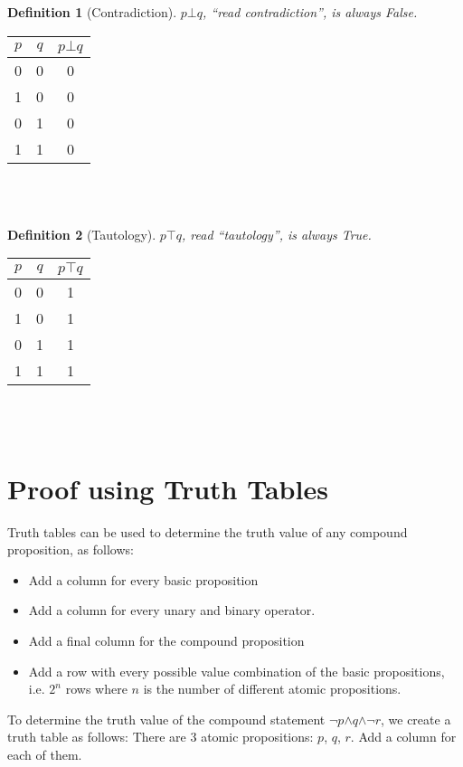 \documentclass[10pt,a4paper,draft,titlepage,onecolumn]{book}
\newtheorem{definition}{Definition}[subsection]
\begin{document}
\begin{definition}[Contradiction] $p{\bot}q$, ``read \textit{contradiction}'', is always False.
\end{definition}
\begin{tabular}{ |c|c|c| }
 \hline
 $p$ & $q$ &  $p{\bot}q$  \\
 \hline
 0 & 0 & 0 \\
 1 & 0 & 0\\
 0 & 1 & 0\\
 1 & 1 & 0\\
 \hline
\end{tabular}\\\\

\begin{definition}[Tautology] $p{\top}q$, read ``\textit{tautology}'', is always True.
\end{definition}
\begin{tabular}{ |c|c|c| }
 \hline
 $p$ & $q$ &  $p{\top}q$  \\
 \hline
 0 & 0 & 1\\
 1 & 0 & 1\\
 0 & 1 & 1\\
 1 & 1 & 1\\
 \hline
\end{tabular}\\\\



\section{Proof using Truth Tables}
Truth tables can be used to determine the truth value of any compound proposition, as follows:

\begin{itemize}
 \item Add a column for every basic proposition 
 \item Add a column for every unary and binary operator.
 \item Add a final column for the compound proposition 
 \item Add a row with every possible value combination of the basic propositions, i.e. $2^n$ rows where $n$ is the number of different atomic propositions. 
\end{itemize}


To determine the truth value of the compound statement {$\neg$}$p${$\wedge$}$q${$\wedge$}{$\neg$}$r$, we create a truth table as follows:
There are 3 atomic propositions: $p$, $q$, $r$. Add a column for each of them.\\
\end{document}
